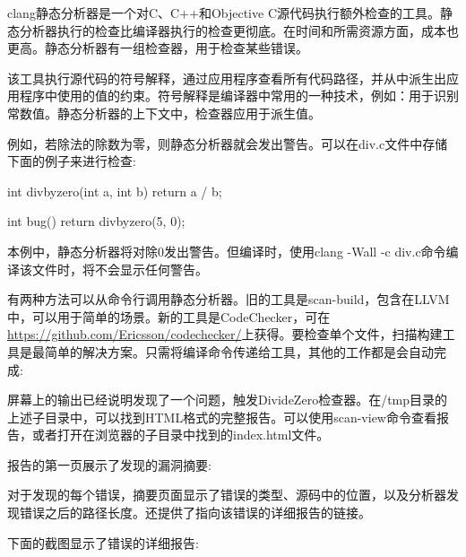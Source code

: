 
clang静态分析器是一个对C、C++和Objective C源代码执行额外检查的工具。静态分析器执行的检查比编译器执行的检查更彻底。在时间和所需资源方面，成本也更高。静态分析器有一组检查器，用于检查某些错误。

该工具执行源代码的符号解释，通过应用程序查看所有代码路径，并从中派生出应用程序中使用的值的约束。符号解释是编译器中常用的一种技术，例如：用于识别常数值。静态分析器的上下文中，检查器应用于派生值。

例如，若除法的除数为零，则静态分析器就会发出警告。可以在div.c文件中存储下面的例子来进行检查:

\begin{cpp}
int divbyzero(int a, int b) { return a / b; }

int bug() { return divbyzero(5, 0); }
\end{cpp}

本例中，静态分析器将对除0发出警告。但编译时，使用clang -Wall -c div.c命令编译该文件时，将不会显示任何警告。

有两种方法可以从命令行调用静态分析器。旧的工具是scan-build，包含在LLVM中，可以用于简单的场景。新的工具是CodeChecker，可在\url{https://github.com/Ericsson/codechecker/}上获得。要检查单个文件，扫描构建工具是最简单的解决方案。只需将编译命令传递给工具，其他的工作都是会自动完成:


屏幕上的输出已经说明发现了一个问题，触发DivideZero检查器。在/tmp目录的上述子目录中，可以找到HTML格式的完整报告。可以使用scan-view命令查看报告，或者打开在浏览器的子目录中找到的index.html文件。

报告的第一页展示了发现的漏洞摘要:


对于发现的每个错误，摘要页面显示了错误的类型、源码中的位置，以及分析器发现错误之后的路径长度。还提供了指向该错误的详细报告的链接。

下面的截图显示了错误的详细报告:


